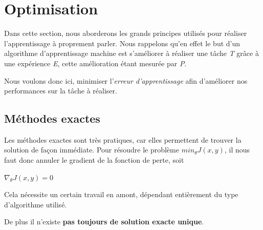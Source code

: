 \documentclass[a4paper, 11pt]{report}
\begin{document}
\section{Optimisation}
Dans cette section, nous aborderons les grands principes utilisés pour réaliser l'apprentissage à proprement parler.
Nous rappelons qu'en effet le but d'un algorithme d'apprentissage machine est s'améliorer à réaliser une tâche \emph{T} grâce à une expérience \emph{E}, cette amélioration étant mesurée par \emph{P}.

Nous voulons donc ici, minimiser l'\emph{erreur d'apprentissage} afin d'améliorer nos performances sur la tâche à réaliser.
\subsection{Méthodes exactes}
Les méthodes exactes sont très pratiques, car elles permettent de trouver la solution de façon immédiate.
Pour résoudre le problème $min_{\theta}J(x,y)$, il nous faut donc annuler le gradient de la fonction de perte, soit
\begin{center}
	$\nabla_{\theta} J(x,y) = 0$
\end{center}
Cela nécessite un certain travail en amont, dépendant entièrement du type d'algorithme utilisé.

De plus il n'existe \textbf{pas toujours de solution exacte unique}.
\end{document}
